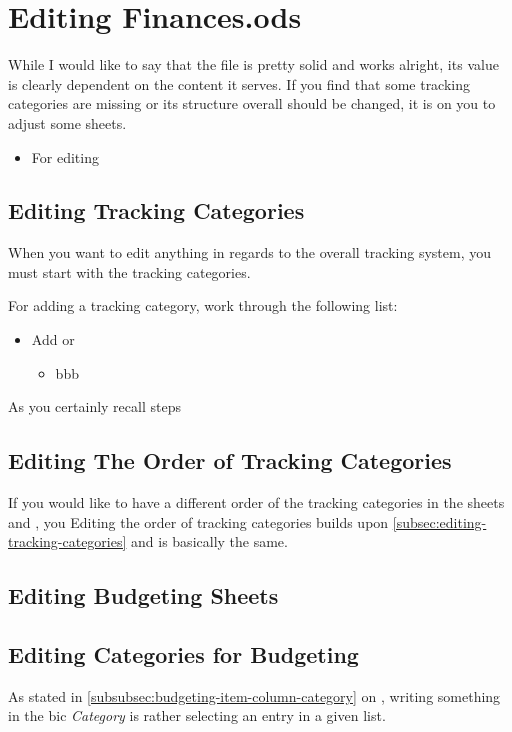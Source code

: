 \section{Editing Finances.ods}
\label{sec:editing-finances.ods}

While I would like to say that the file is pretty solid and works alright, its value is clearly dependent on the content it serves.
If you find that some tracking categories are missing or its structure overall should be changed, it is on you to adjust some sheets.
\begin{itemize}
	\item For editing 
\end{itemize}


\subsection{Editing Tracking Categories}
\label{subsec:editing-tracking-categories}

When you want to edit anything in regards to the overall tracking system, you must start with the tracking categories.

For adding a tracking category, work through the following list:
\begin{itemize}
	\item Add or 
	\begin{itemize}
		\item bbb
	\end{itemize}
\end{itemize}
As you certainly recall steps 

\subsection{Editing The Order of Tracking Categories}
\label{subsec:editing-order-of-tracking-categories}

If you would like to have a different order of the tracking categories in the sheets  and , you 
Editing the order of tracking categories builds upon \autoref{subsec:editing-tracking-categories} and is basically the same.

\subsection{Editing Budgeting Sheets}
\label{subsec:editing-budgeting-sheets}

\subsection{Editing Categories for Budgeting}
\label{subsec:editing-categories-for-budgeting}

As stated in \autoref{subsubsec:budgeting-item-column-category} on , writing something in the \ac{bic} \emph{Category}  is rather selecting an entry in a given list.